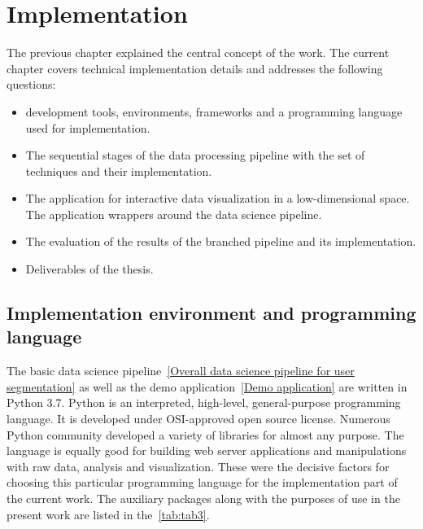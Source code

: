 \chapter{Implementation}
\label{cha:implementation}

The previous chapter explained the central concept of the work. The current chapter covers technical implementation details and addresses the following questions:

\begin{itemize}
  \item development tools, environments, frameworks and a programming language used for implementation.
  \item The sequential stages of the data processing pipeline with the set of techniques and their implementation.
  \item The application for interactive data visualization in a low-dimensional space. The application wrappers around the data science pipeline.
  \item The evaluation of the results of the branched pipeline and its implementation.
  \item Deliverables of the thesis.
\end{itemize}

\section{Implementation environment and programming language}
The basic data science pipeline~\ref{Overall data science pipeline for user segmentation} as well as the demo application~\ref{Demo application} are written in Python 3.7. Python is an interpreted, high-level, general-purpose programming language. It is developed under OSI-approved open source license. Numerous Python community developed a variety of libraries for almost any purpose. The language is equally good for building web server applications and manipulations with raw data, analysis and visualization. These were the decisive factors for choosing this particular programming language for the implementation part of the current work. The auxiliary packages along with the purposes of use in the present work are listed in the~\autoref{tab:tab3}.

